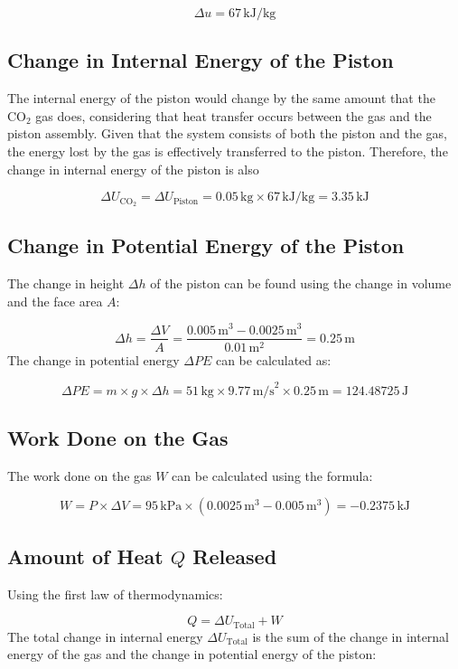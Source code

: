 \documentclass[12pt]{article}
\begin{document}
\[
\Delta u = 67 \, \text{kJ/kg}
\]

\subsection*{Change in Internal Energy of the Piston}
The internal energy of the piston would change by the same amount that the \(\text{CO}_2\) gas does, considering that heat transfer occurs between the gas and the piston assembly. Given that the system consists of both the piston and the gas, the energy lost by the gas is effectively transferred to the piston. Therefore, the change in internal energy of the piston is also

\[
\Delta U_{\text{CO}_2} = \Delta U_{\text{Piston}} = 0.05 \, \text{kg} \times 67 \, \text{kJ/kg} = 3.35 \, \text{kJ}
\]


\subsection*{Change in Potential Energy of the Piston}
The change in height \(\Delta h\) of the piston can be found using the change in volume and the face area \(A\):

\[
\Delta h = \frac{\Delta V}{A} = \frac{0.005 \, \text{m}^3 - 0.0025 \, \text{m}^3}{0.01 \, \text{m}^2} = 0.25 \, \text{m}
\]
The change in potential energy \(\Delta PE\) can be calculated as:

\[
\Delta PE = m \times g \times \Delta h = 51 \, \text{kg} \times 9.77 \, \text{m/s}^2 \times 0.25 \, \text{m} = 124.48725 \, \text{J}
\]

\subsection*{Work Done on the Gas}
The work done on the gas \(W\) can be calculated using the formula:

\[
W = P \times \Delta V = 95 \, \text{kPa} \times (0.0025 \, \text{m}^3 - 0.005 \, \text{m}^3) = -0.2375 \, \text{kJ}
\]

\subsection*{Amount of Heat \(Q\) Released}
Using the first law of thermodynamics:

\[
Q = \Delta U_{\text{Total}} + W
\]
The total change in internal energy \(\Delta U_{\text{Total}}\) is the sum of the change in internal energy of the gas and the change in potential energy of the piston:
\end{document}
